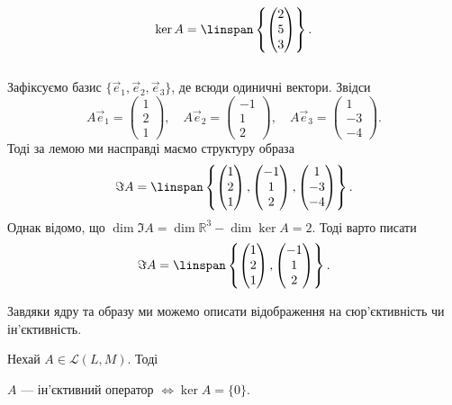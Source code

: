 \documentclass{math_library}
\begin{document}
\begin{example}
	\[
	\ker A = \linspan \left\{\begin{pmatrix} 2 \\ 5 \\ 3 \end{pmatrix} \right\}.
	\]
	\bigskip \\
	Зафіксуємо базис $\{\vec{e}_1, \vec{e}_2, \vec{e}_3\}$, де всюди одиничні вектори. Звідси 
	\[
	A \vec{e}_1 = \begin{pmatrix}
	1 \\ 2 \\ 1
	\end{pmatrix},\quad A \vec{e}_2 = \begin{pmatrix}
	-1 \\ 1 \\ 2
	\end{pmatrix},\quad A \vec{e}_3 = \begin{pmatrix}
	1 \\ -3 \\ -4
	\end{pmatrix}.
	\]
	Тоді за лемою ми насправді маємо структуру образа 
	\[
	\Im A = \linspan \left\{ \begin{pmatrix} 1 \\ 2 \\ 1 \end{pmatrix}, \begin{pmatrix} -1 \\ 1 \\ 2 \end{pmatrix}, \begin{pmatrix} 1 \\ -3 \\ -4 \end{pmatrix} \right\}.
	\]
	Однак відомо, що $\dim \Im A = \dim \mathbb{R}^3 - \dim \ker A = 2$. Тоді варто писати 
	\[
	\Im A = \linspan \left\{ \begin{pmatrix} 1 \\ 2 \\ 1 \end{pmatrix}, \begin{pmatrix} -1 \\ 1 \\ 2 \end{pmatrix} \right\}.
	\]
	\end{example}
	\noindent
	Завдяки ядру та образу ми можемо описати відображення на сюр'єктивність чи ін'єктивність.
	\begin{proposition}
	\label{one-to-one_criterion}
	Нехай $A \in \mathcal{L}(L,M)$. Тоді
	\begin{center}
	$A$ --- ін'єктивний оператор $\iff \ker A = \{0\}$.
	\end{center}
	\end{proposition}
	
\end{document}
